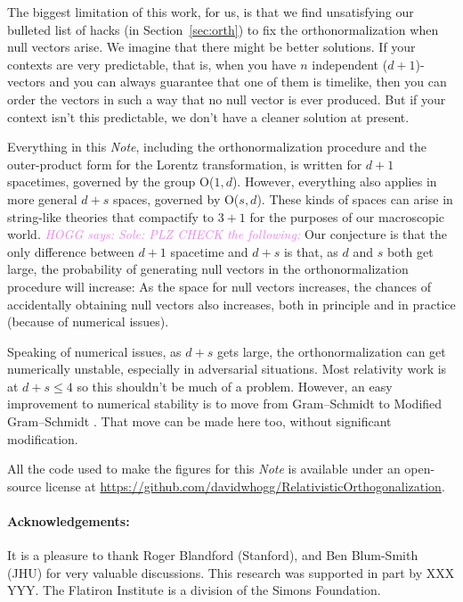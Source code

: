 \documentclass{article}
\newcommand{\plus}{\!+\!} %
\newcommand{\documentname}{\textsl{Note}}
\newcommand{\secref}[1]{Section~\ref{#1}}
\newcommand{\HOGG}[1]{\textcolor{violet}{\textsl{HOGG says: {#1}}}}
\begin{document}
The biggest limitation of this work, for us, is that we find unsatisfying our bulleted list of hacks (in \secref{sec:orth}) to fix the orthonormalization when null vectors arise.
We imagine that there might be better solutions.
If your contexts are very predictable, that is, when you have $n$ independent ($d\plus1$)-vectors and you can always guarantee that one of them is timelike, then you can order the vectors in such a way that no null vector is ever produced.
But if your context isn't this predictable, we don't have a cleaner solution at present.

Everything in this \documentname{}, including the orthonormalization procedure and the outer-product form for the Lorentz transformation, is written for $d\plus1$ spacetimes, governed by the group O($1,d$).
However, everything also applies in more general $d\plus s$ spaces, governed by O($s,d$).
These kinds of spaces can arise in string-like theories that compactify to $3\plus 1$ for the purposes of our macroscopic world.
\HOGG{Sole: PLZ CHECK the following:}
Our conjecture is that the only difference between $d\plus1$ spacetime and $d\plus s$ is that, as $d$ and $s$ both get large, the probability of generating null vectors in the orthonormalization procedure will increase:
As the space for null vectors increases, the chances of accidentally obtaining null vectors also increases, both in principle and in practice (because of numerical issues).

Speaking of numerical issues, as $d+s$ gets large, the orthonormalization can get numerically unstable, especially in adversarial situations.
Most relativity work is at $d+s\leq 4$ so this shouldn't be much of a problem.
However, an easy improvement to numerical stability is to move from Gram--Schmidt to Modified Gram--Schmidt \cite{modifiedgramschmidt}.
That move can be made here too, without significant modification.

All the code used to make the figures for this \documentname{} is available under an open-source license at \url{https://github.com/davidwhogg/RelativisticOrthogonalization}.

\paragraph{Acknowledgements:}
It is a pleasure to thank
  Roger Blandford (Stanford), and
  Ben Blum-Smith (JHU)
for very valuable discussions.
This research was supported in part by XXX YYY.
The Flatiron Institute is a division of the Simons Foundation.

\raggedright


\end{document}
